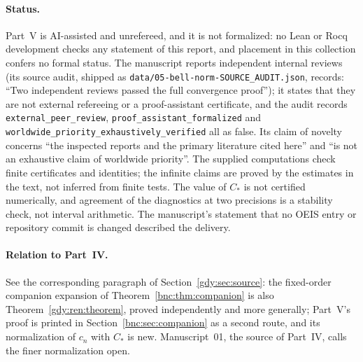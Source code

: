 \documentclass[11pt]{article}
\numberwithin{equation}{section}
\theoremstyle{definition}
\theoremstyle{remark}
\begin{document}
\paragraph{Status.}
Part~V is AI-assisted and unrefereed, and it is not formalized: no Lean
or Rocq development checks any statement of this report, and placement
in this collection confers no formal status. The manuscript reports
independent internal reviews (its source audit, shipped as
\nolinkurl{data/05-bell-norm-SOURCE_AUDIT.json}, records: ``Two
independent reviews passed the full convergence proof''); it states
that they are not external refereeing or a proof-assistant certificate,
and the audit records \texttt{external\_peer\_review}, \texttt{proof\_assistant\_formalized}
and \texttt{worldwide\_priority\_exhaustively\_verified} all as false.
Its claim of novelty concerns ``the inspected reports and the primary
literature cited here'' and ``is not an exhaustive claim of worldwide
priority''. The supplied computations check finite certificates and
identities; the infinite claims are proved by the estimates in the text,
not inferred from finite tests. The value of $C_*$ is not certified
numerically, and agreement of the diagnostics at two precisions is a
stability check, not interval arithmetic. The manuscript's statement
that no OEIS entry or repository commit is changed described the
delivery.

\paragraph{Relation to Part~IV.}
See the corresponding paragraph of Section~\ref{gdy:sec:source}: the
fixed-order companion expansion of Theorem~\ref{bnc:thm:companion} is
also Theorem~\ref{gdy:ren:theorem}, proved independently and more
generally; Part~V's proof is printed in Section~\ref{bnc:sec:companion}
as a second route, and its normalization of $c_n$ with $C_*$ is new.
Manuscript~01, the source of Part~IV, calls the finer normalization open.
\end{document}
